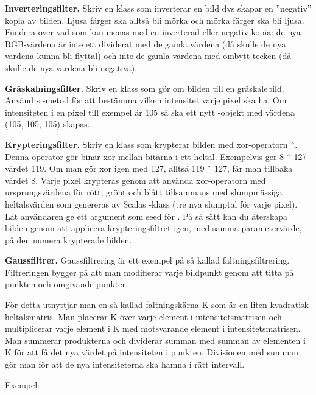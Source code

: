 \Task \textbf{Inverteringsfilter.} Skriv en klass  som inverterar en bild dvs skapar en ''negativ'' kopia av bilden. Ljusa färger ska alltså bli mörka och mörka färger ska bli ljusa.
Fundera över vad som kan menas med en inverterad eller negativ kopia: de nya RGB-värdena är inte ett dividerat med de gamla värdena (då skulle de nya värdena kunna bli flyttal) och inte de gamla värdena med ombytt tecken (då skulle de nya värdena bli negativa).

\Task \textbf{Gråskalningsfilter.} Skriv en klass  som gör om bilden till en gråskalebild. Använd s -metod för att bestämma vilken intensitet varje pixel ska ha. Om intensiteten i en pixel till exempel är 105 så ska ett nytt -objekt med värdena (105, 105, 105) skapas.

\Task \textbf{Krypteringsfilter.} Skriv en klass  som krypterar bilden med xor-operatorn ˆ. Denna operator gör binär xor mellan bitarna i ett heltal. Exempelvis ger 8 ˆ 127 värdet 119. Om man gör xor igen med 127, alltså 119 ˆ 127, får man tillbaka värdet 8. Varje pixel krypteras genom att använda xor-operatorn med ursprungsvärdena för rött, grönt och blått tillsammans med slumpmässiga heltalsvärden som genereras av Scalas -klass (tre nya slumptal för varje pixel). Låt användaren ge ett argument som seed för . På så sätt kan du återskapa bilden genom att applicera krypteringsfiltret igen, med samma parametervärde, på den numera krypterade bilden.

\Task \textbf{Gaussfiltrer.} Gaussfiltrering är ett exempel på så kallad faltningsfiltrering. Filtreringen bygger på att man modifierar varje bildpunkt genom att titta på punkten och omgivande punkter.

För detta utnyttjar man en så kallad faltningskärna K som är en liten kvadratisk heltalsmatris. Man placerar K över varje element i intensitetsmatrisen och multiplicerar varje element i K med motsvarande element i intensitetsmatrisen. Man summerar produkterna och dividerar summan med summan av elementen i K för att få det nya värdet på intensiteten i punkten. Divisionen med summan gör man för att de nya intensiteterna ska hamna i rätt intervall.

Exempel:

